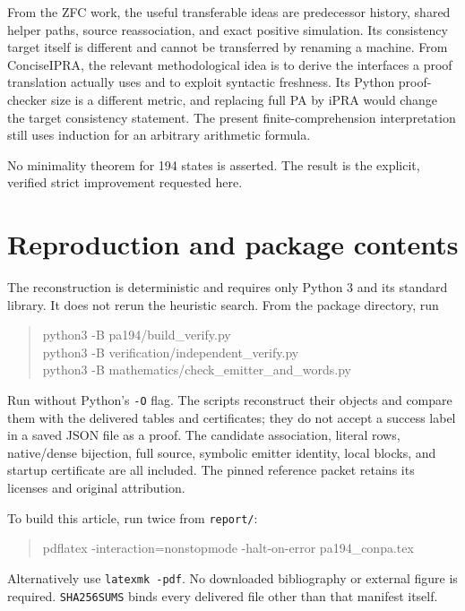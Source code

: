 \documentclass[11pt,letterpaper]{article}
\newcommand{\file}[1]{\texttt{\nolinkurl{#1}}}
\newcommand{\code}[1]{\texttt{#1}}
\begin{document}
From the ZFC work, the useful transferable ideas are predecessor
history, shared helper paths, source reassociation, and exact positive
simulation. Its consistency target itself is different and cannot
be transferred by renaming a machine. From ConciseIPRA, the relevant
methodological idea is to derive the interfaces a proof translation
actually uses and to exploit syntactic freshness. Its Python
proof-checker size is a different metric, and replacing full PA by
iPRA would change the target consistency statement. The present
finite-comprehension interpretation still uses induction for an
arbitrary arithmetic formula.

No minimality theorem for 194 states is asserted. The result is the
explicit, verified strict improvement requested here.

\section{Reproduction and package contents}
The reconstruction is deterministic and requires only Python 3 and
its standard library. It does not rerun the heuristic search. From
the package directory, run
\begin{quote}\ttfamily\small
python3 -B pa194/build\_verify.py\\
python3 -B verification/independent\_verify.py\\
python3 -B mathematics/check\_emitter\_and\_words.py
\end{quote}
Run without Python's \code{-O} flag. The scripts reconstruct their
objects and compare them with the delivered tables and certificates;
they do not accept a success label in a saved JSON file as a proof.
The candidate association, literal rows, native/dense bijection,
full source, symbolic emitter identity, local blocks, and startup
certificate are all included. The pinned reference packet retains its
licenses and original attribution.

To build this article, run twice from \file{report/}:
\begin{quote}\ttfamily\small
pdflatex -interaction=nonstopmode -halt-on-error pa194\_conpa.tex
\end{quote}
Alternatively use \code{latexmk -pdf}. No downloaded bibliography or
external figure is required. \file{SHA256SUMS} binds every delivered
file other than that manifest itself.
\end{document}

